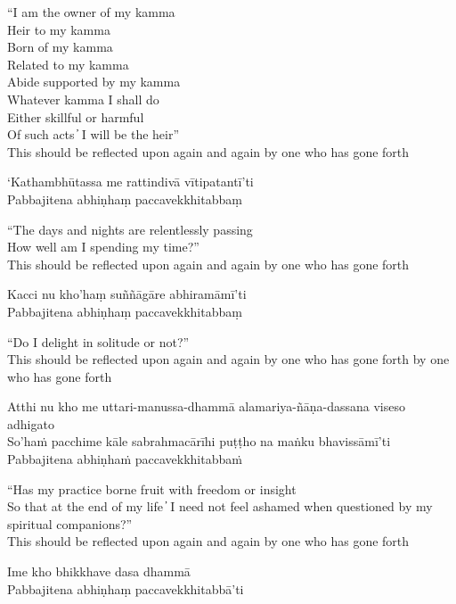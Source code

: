\begin{english}
“I am the owner of my kamma\\
Heir to my kamma\\
Born of my kamma\\
Related to my kamma\\
Abide supported by my kamma\\
Whatever kamma I shall do\\
Either skillful or harmful\\
Of such acts  ̓  I will be the heir”\\
This should be reflected upon again and again by one who has gone forth
\end{english}

`Kathambhūtassa me rattindivā vītipatantī'ti\\
Pabbajitena abhiṇhaṃ paccavekkhitabbaṃ

\begin{english}
“The days and nights are relentlessly passing\\
How well am I spending my time?”\\
This should be reflected upon again and again by one who has gone forth
\end{english}

Kacci nu kho'haṃ suññāgāre abhiramāmī'ti\\
Pabbajitena abhiṇhaṃ paccavekkhitabbaṃ

\begin{english}
“Do I delight in solitude or not?”\\
This should be reflected upon again and again by one who has gone forth by one who has gone forth
\end{english}

Atthi nu kho me uttari-manussa-dhammā alamariya-ñāṇa-dassana viseso adhigato\\
So’haṁ pacchime kāle sabrahmacārīhi puṭṭho na maṅku bhavissāmī’ti\\
Pabbajitena abhiṇhaṁ paccavekkhitabbaṁ

\begin{english}
“Has my practice borne fruit with freedom or insight\\
So that at the end of my life  ̓  I need not feel ashamed when questioned by my spiritual companions?”\\
This should be reflected upon again and again by one who has gone forth
\end{english}

Ime kho bhikkhave dasa dhammā\\
Pabbajitena abhiṇhaṃ paccavekkhitabbā'ti

